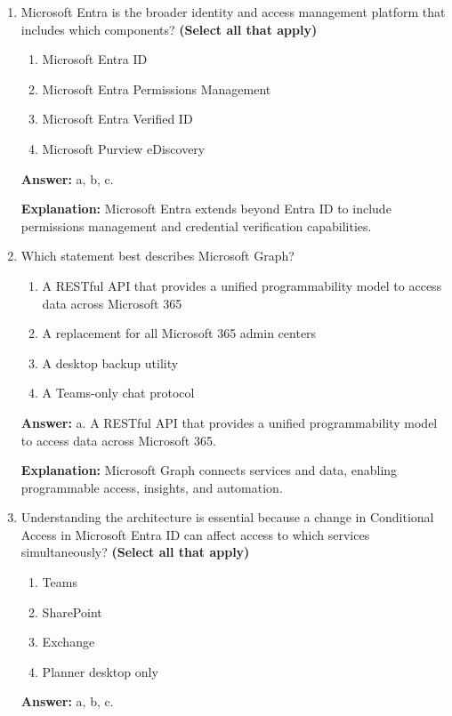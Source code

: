 \documentclass[10pt]{article}
\begin{document}
\begin{enumerate}[leftmargin=*]
\textbf{Explanation:} These identity and access controls are part of the Microsoft Entra ID foundation for Microsoft 365.

\item Microsoft Entra is the broader identity and access management platform that includes which components? \textbf{(Select all that apply)}
\begin{enumerate}[label=\alph*., leftmargin=1.5em]
\item Microsoft Entra ID
\item Microsoft Entra Permissions Management
\item Microsoft Entra Verified ID
\item Microsoft Purview eDiscovery
\end{enumerate}
\textbf{Answer:} a, b, c.

\textbf{Explanation:} Microsoft Entra extends beyond Entra ID to include permissions management and credential verification capabilities.

\item Which statement best describes Microsoft Graph?
\begin{enumerate}[label=\alph*., leftmargin=1.5em]
\item A RESTful API that provides a unified programmability model to access data across Microsoft 365
\item A replacement for all Microsoft 365 admin centers
\item A desktop backup utility
\item A Teams-only chat protocol
\end{enumerate}
\textbf{Answer:} a. A RESTful API that provides a unified programmability model to access data across Microsoft 365.

\textbf{Explanation:} Microsoft Graph connects services and data, enabling programmable access, insights, and automation.

\item Understanding the architecture is essential because a change in Conditional Access in Microsoft Entra ID can affect access to which services simultaneously? \textbf{(Select all that apply)}
\begin{enumerate}[label=\alph*., leftmargin=1.5em]
\item Teams
\item SharePoint
\item Exchange
\item Planner desktop only
\end{enumerate}
\textbf{Answer:} a, b, c.


\end{enumerate}
\end{document}
